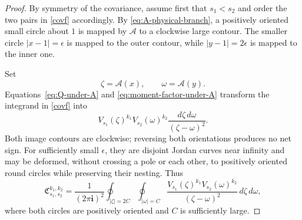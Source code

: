 \documentclass[11pt]{amsart}
\theoremstyle{plain}
\numberwithin{equation}{section}
\numberwithin{theorem}{section}
\numberwithin{figure}{section}
\begin{document}
\begin{proof}
By symmetry of the covariance, assume first that \(s_1<s_2\) and
order the two pairs in \eqref{covf} accordingly.  By
\eqref{eq:A-physical-branch}, a positively oriented small circle about
\(1\) is mapped by \(\mathscr A\) to a clockwise large contour.  The
smaller circle \(|x-1|=\epsilon\) is mapped to the outer contour, while
\(|y-1|=2\epsilon\) is mapped to the inner one.  


Set
\[
    \zeta=\mathscr A(x),
    \qquad
    \omega=\mathscr A(y).
\]
Equations~\eqref{eq:Q-under-A} and
\eqref{eq:moment-factor-under-A} transform the integrand in
\eqref{covf} into
\[
    V_{s_1}(\zeta)^{k_1}
    V_{s_2}(\omega)^{k_2}
    \frac{d\zeta\,d\omega}{(\zeta-\omega)^2}.
\]
Both image contours are clockwise; reversing both orientations
produces no net sign.
  For sufficiently small
\(\epsilon\), they are disjoint Jordan curves near infinity and may be
deformed, without crossing a pole or each other, to positively oriented
round circles while preserving their nesting.  Thus
\begin{equation}
    \mathfrak C_{s_1,s_2}^{k_1,k_2}
    =
    \frac{1}{(2\pi\mathbf i)^2}
    \oint_{|\zeta|=2C}
    \oint_{|\omega|=C}
    \frac{V_{s_1}(\zeta)^{k_1}V_{s_2}(\omega)^{k_2}}
         {(\zeta-\omega)^2}
    \,d\zeta\,d\omega,
    \label{eq:large-spectral-covariance}
\end{equation}
where both circles are positively oriented and \(C\) is sufficiently
large.  


\end{proof}
\end{document}
